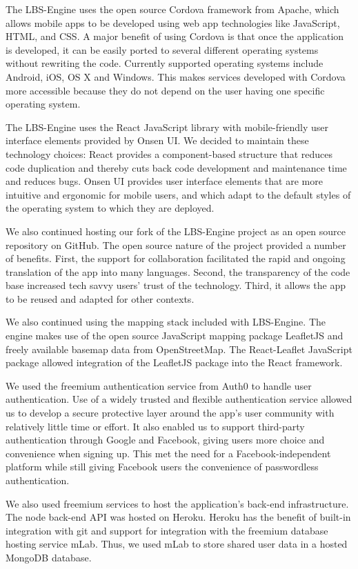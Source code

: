 The LBS-Engine uses the open source Cordova framework from Apache, which allows mobile apps to be developed using web app technologies like JavaScript, HTML, and CSS. A major benefit of using Cordova is that once the application is developed, it can be easily ported to several different operating systems without rewriting the code. Currently supported operating systems include Android, iOS, OS X and Windows. This makes services developed with Cordova more accessible because they do not depend on the user having one specific operating system.

The LBS-Engine uses the React JavaScript library with mobile-friendly user interface elements provided by Onsen UI. We decided to maintain these technology choices: React provides a component-based structure that reduces code duplication and thereby cuts back code development and maintenance time and reduces bugs. Onsen UI provides user interface elements that are more intuitive and ergonomic for mobile users, and which adapt to the default styles of the operating system to which they are deployed.

We also continued hosting our fork of the LBS-Engine project as an open source repository on GitHub. The open source nature of the project provided a number of benefits. First, the support for collaboration facilitated the rapid and ongoing translation of the app into many languages. Second, the transparency of the code base increased tech savvy users' trust of the technology. Third, it allows the app to be reused and adapted for other contexts.

We also continued using the mapping stack included with LBS-Engine. The engine makes use of the open source JavaScript mapping package LeafletJS and freely available basemap data from OpenStreetMap. The React-Leaflet JavaScript package allowed integration of the LeafletJS package into the React framework.

We used the freemium authentication service from Auth0 to handle user authentication. Use of a widely trusted and flexible authentication service allowed us to develop a secure protective layer around the app's user community with relatively little time or effort. It also enabled us to support third-party authentication through Google and Facebook, giving users more choice and convenience when signing up. This met the need for a Facebook-independent platform while still giving Facebook users the convenience of passwordless authentication.

We also used freemium services to host the application's back-end infrastructure. The node back-end API was hosted on Heroku. Heroku has the benefit of built-in integration with git and support for integration with the freemium database hosting service mLab. Thus, we used mLab to store shared user data in a hosted MongoDB database.

